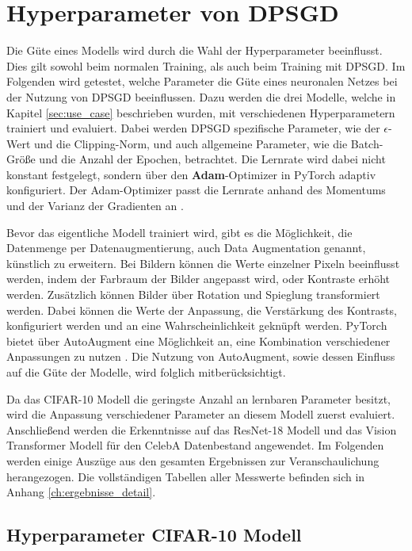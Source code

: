 \section{Hyperparameter von DPSGD}\label{sec:hyperparams}

Die Güte eines Modells wird durch die Wahl der Hyperparameter beeinflusst. 
Dies gilt sowohl beim normalen Training, als auch beim Training mit DPSGD.
Im Folgenden wird getestet, welche Parameter die Güte eines neuronalen Netzes bei der Nutzung von DPSGD beeinflussen.
Dazu werden die drei Modelle, welche in Kapitel \ref{sec:use_case} beschrieben wurden, mit verschiedenen Hyperparametern trainiert und evaluiert.
Dabei werden DPSGD spezifische Parameter, wie der $\epsilon$-Wert und die Clipping-Norm, und auch allgemeine Parameter, wie die Batch-Größe und die Anzahl der Epochen, betrachtet.
Die Lernrate wird dabei nicht konstant festgelegt, sondern über den \textbf{Adam}-Optimizer in PyTorch adaptiv konfiguriert.
Der Adam-Optimizer passt die Lernrate anhand des Momentums und der Varianz der Gradienten an \cite{adam}.

Bevor das eigentliche Modell trainiert wird, gibt es die Möglichkeit, die Datenmenge per Datenaugmentierung, auch Data Augmentation genannt, künstlich zu erweitern.
Bei Bildern können die Werte einzelner Pixeln beeinflusst werden, indem der Farbraum der Bilder angepasst wird, oder Kontraste erhöht werden.
Zusätzlich können Bilder über Rotation und Spieglung transformiert werden.
Dabei können die Werte der Anpassung, \zB die Verstärkung des Kontrasts, konfiguriert werden und an eine Wahrscheinlichkeit geknüpft werden.
PyTorch bietet über AutoAugment eine Möglichkeit an, eine Kombination verschiedener Anpassungen zu nutzen \cite{autoaugment}.
Die Nutzung von AutoAugment, sowie dessen Einfluss auf die Güte der Modelle, wird folglich mitberücksichtigt.

Da das CIFAR-10 Modell die geringste Anzahl an lernbaren Parameter besitzt, wird die Anpassung verschiedener Parameter an diesem Modell zuerst evaluiert.
Anschließend werden die Erkenntnisse auf das ResNet-18 Modell und das Vision Transformer Modell für den CelebA Datenbestand angewendet.
Im Folgenden werden einige Auszüge aus den gesamten Ergebnissen zur Veranschaulichung herangezogen. 
Die vollständigen Tabellen aller Messwerte befinden sich in Anhang \ref{ch:ergebnisse_detail}.

\subsection{Hyperparameter CIFAR-10 Modell}


